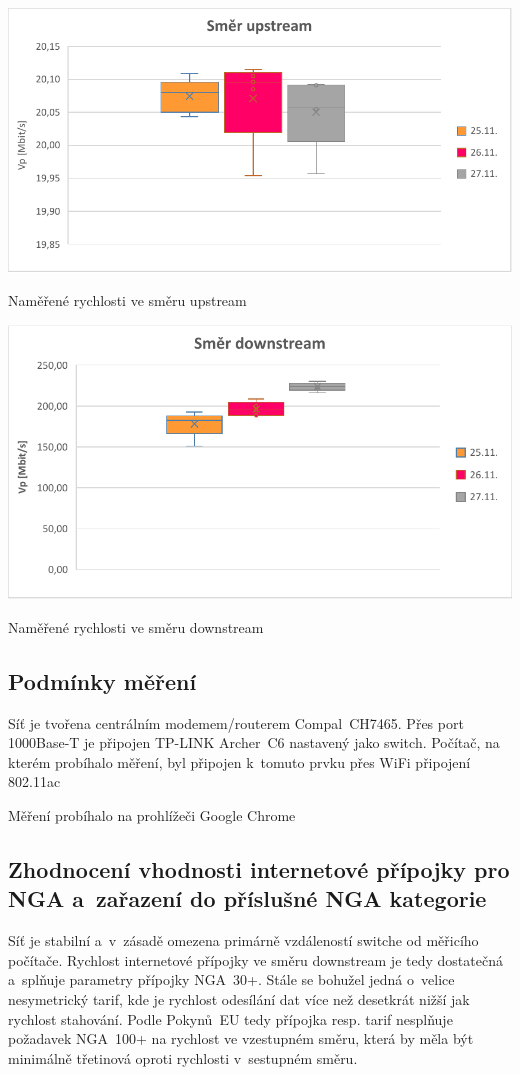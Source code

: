 \documentclass[a4paper,12pt]{article}   %
\begin{document}
\begin{graf}[hbtp]
  \centering
  \includegraphics[width = .6\textwidth]{tsi_uplink.pdf}
  \caption{Naměřené rychlosti ve směru upstream}
  \label{fig:up}
\end{graf}

\begin{graf}[hbtp]
  \centering
  \includegraphics[width = .6\textwidth]{tsi_downlink.pdf}
  \caption{Naměřené rychlosti ve směru downstream}
  \label{fig:down}
\end{graf}


\subsection*{Podmínky měření}
Síť je tvořena centrálním modemem/routerem Compal~CH7465. Přes port 1000Base-T je připojen TP-LINK Archer~C6 nastavený jako switch. Počítač, na kterém probíhalo měření, byl připojen k~tomuto prvku přes WiFi připojení 802.11ac

Měření probíhalo na prohlížeči Google Chrome


\subsection*{Zhodnocení vhodnosti internetové přípojky pro NGA a~zařazení do příslušné NGA kategorie}
Síť je stabilní a~v~zásadě omezena primárně vzdáleností switche od měřicího počítače. Rychlost internetové přípojky ve směru downstream je tedy dostatečná a~splňuje parametry přípojky NGA~30+. Stále se bohužel jedná o~velice nesymetrický tarif, kde je rychlost odesílání dat více než desetkrát nižší jak rychlost stahování. Podle Pokynů~EU tedy přípojka resp. tarif nesplňuje požadavek NGA~100+ na rychlost ve vzestupném směru, která by měla být minimálně třetinová oproti rychlosti v~sestupném směru.
\end{document}
